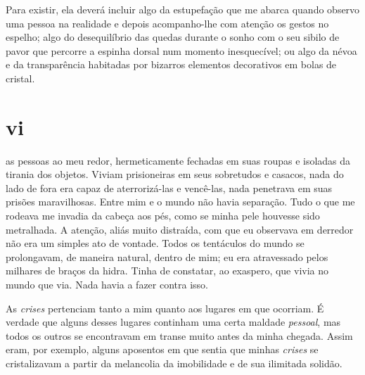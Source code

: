  

Para existir, ela deverá incluir algo da estupefação que me abarca quando
observo uma pessoa na realidade e depois acompanho-lhe com atenção os gestos
no espelho; algo do desequilíbrio das quedas durante o sonho com o seu sibilo
de pavor que percorre a espinha dorsal num momento inesquecível; ou algo da
névoa e da transparência habitadas por bizarros elementos decorativos em
bolas de cristal.


\section{vi} 

 as pessoas ao meu redor, hermeticamente fechadas em suas
 roupas e isoladas da tirania dos objetos. Viviam prisioneiras em seus
 sobretudos e casacos, nada do lado de fora era capaz de aterrorizá-las e
 vencê-las, nada penetrava em suas prisões maravilhosas. Entre mim e o mundo
 não havia separação. Tudo o que me rodeava me invadia da cabeça aos pés,
 como se minha pele houvesse sido metralhada. A atenção, aliás muito
 distraída, com que eu observava em derredor não era um simples ato de
 vontade. Todos os tentáculos do mundo se prolongavam, de maneira natural,
 dentro de mim; eu era atravessado pelos milhares de braços da hidra. Tinha
 de constatar, ao exaspero, que vivia no mundo que via. Nada havia a fazer
 contra isso.

As \textit{crises} pertenciam tanto a mim quanto aos lugares em que ocorriam.
É verdade que alguns desses lugares continham uma certa maldade \textit
{pessoal}, mas todos os outros se encontravam em transe muito antes da minha
chegada. Assim eram, por exemplo, alguns aposentos em que sentia que
minhas \textit{crises} se cristalizavam a partir da melancolia da imobilidade
e de sua ilimitada solidão.


